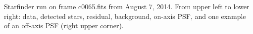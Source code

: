 Starfinder run on frame c0065.fits from August 7, 2014. From upper left to lower right: data, detected stars, residual, background, on-axis PSF, and one example of an off-axis PSF (right upper corner).
  
  